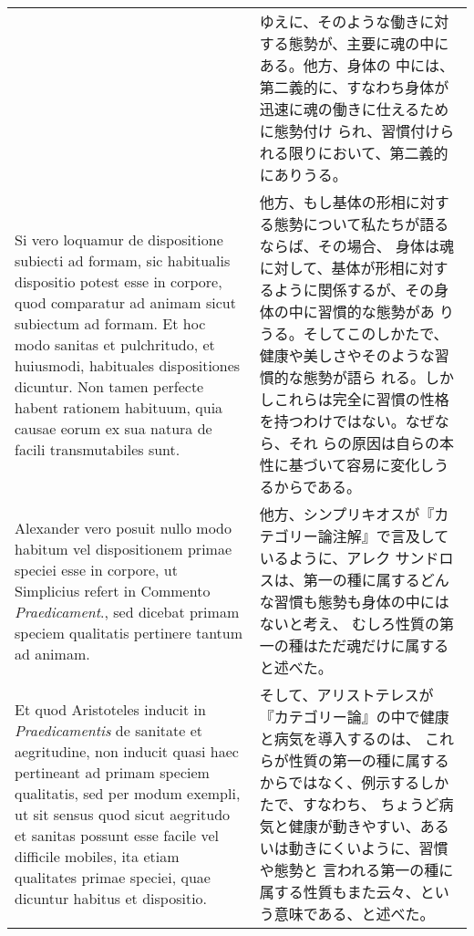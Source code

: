 \documentclass[10pt]{jsarticle} %
\begin{document}
\begin{longtable}{p{21em}p{21em}}
&

ゆえに、そのような働きに対する態勢が、主要に魂の中にある。他方、身体の
中には、第二義的に、すなわち身体が迅速に魂の働きに仕えるために態勢付け
られ、習慣付けられる限りにおいて、第二義的にありうる。


\\


Si vero loquamur de dispositione subiecti ad formam, sic habitualis
dispositio potest esse in corpore, quod comparatur ad animam sicut
subiectum ad formam. Et hoc modo sanitas et pulchritudo, et huiusmodi,
habituales dispositiones dicuntur. Non tamen perfecte habent rationem
habituum, quia causae eorum ex sua natura de facili transmutabiles
sunt.


&

他方、もし基体の形相に対する態勢について私たちが語るならば、その場合、
身体は魂に対して、基体が形相に対するように関係するが、その身体の中に習慣的な態勢があ
りうる。そしてこのしかたで、健康や美しさやそのような習慣的な態勢が語ら
れる。しかしこれらは完全に習慣の性格を持つわけではない。なぜなら、それ
らの原因は自らの本性に基づいて容易に変化しうるからである。

\\


Alexander vero posuit nullo modo habitum vel dispositionem primae
speciei esse in corpore, ut Simplicius refert in Commento
{\itshape Praedicament}., sed dicebat primam speciem qualitatis pertinere tantum
ad animam. 


&

他方、シンプリキオスが『カテゴリー論注解』で言及しているように、アレク
サンドロスは、第一の種に属するどんな習慣も態勢も身体の中にはないと考え、
むしろ性質の第一の種はただ魂だけに属すると述べた。

\\


Et quod Aristoteles inducit in {\itshape Praedicamentis} de sanitate
et aegritudine, non inducit quasi haec pertineant ad primam speciem
qualitatis, sed per modum exempli, ut sit sensus quod sicut aegritudo
et sanitas possunt esse facile vel difficile mobiles, ita etiam
qualitates primae speciei, quae dicuntur habitus et dispositio. 


&

そして、アリストテレスが『カテゴリー論』の中で健康と病気を導入するのは、
これらが性質の第一の種に属するからではなく、例示するしかたで、すなわち、
ちょうど病気と健康が動きやすい、あるいは動きにくいように、習慣や態勢と
言われる第一の種に属する性質もまた云々、という意味である、と述べた。


\end{longtable}
\end{document}
